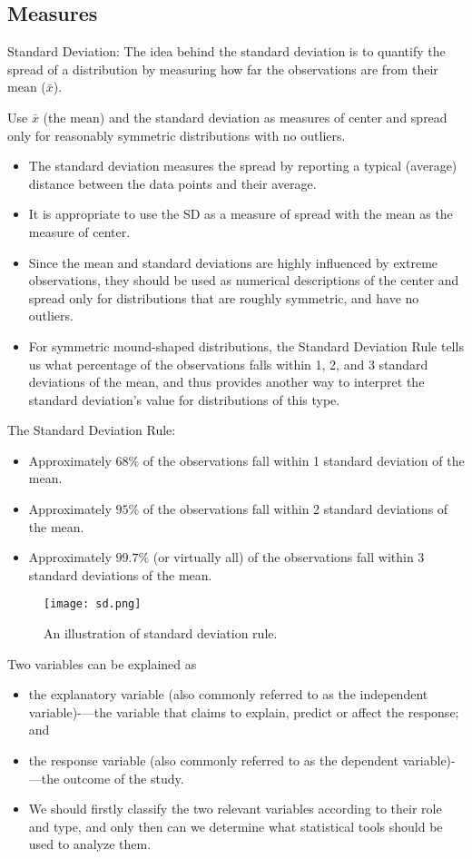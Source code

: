 \documentclass[10pt, a4paper]{article}
\begin{document}
\subsection{Measures}
Standard Deviation: 
The idea behind the standard deviation is to quantify the spread of a distribution by measuring how far the observations are from their mean ($\bar{x}$).\par
Use $\bar{x}$ (the mean) and the standard deviation as measures of center and spread only for reasonably symmetric distributions with no outliers.
\begin{itemize}
\item The standard deviation measures the spread by reporting a typical (average) distance between the data points and their average.
\item It is appropriate to use the SD as a measure of spread with the mean as the measure of center.
\item Since the mean and standard deviations are highly influenced by extreme observations, they should be used as numerical descriptions of the center and spread only for distributions that are roughly symmetric, and have no outliers.
\item For symmetric mound-shaped distributions, the Standard Deviation Rule tells us what percentage of the observations falls within 1, 2, and 3 standard deviations of the mean, and thus provides another way to interpret the standard deviation's value for distributions of this type.
\end{itemize}
The Standard Deviation Rule:
 \begin{itemize}
\item Approximately $68\%$ of the observations fall within 1 standard deviation of the mean.
\item Approximately $95\%$ of the observations fall within 2 standard deviations of the mean.
\item Approximately $99.7\%$ (or virtually all) of the observations fall within 3 standard deviations of the mean.
\end{itemize}
\begin{figure}
    [h!]
    \centering
    \texttt{[image: sd.png]}
    \caption{An illustration of standard deviation rule.}
\end{figure}
Two variables can be explained as
\begin{itemize}
\item the explanatory variable (also commonly referred to as the independent variable)-—the variable that claims to explain, predict or affect the response; and
\item the response variable (also commonly referred to as the dependent variable)-—the outcome of the study.
\item We should firstly classify the two relevant variables according to their role and type, and only then can we determine what statistical tools should be used to analyze them.
\end{itemize}
\end{document}
